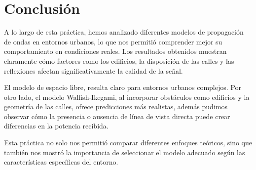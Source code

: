 \section{\Large Conclusión}

A lo largo de esta práctica, hemos analizado diferentes modelos de propagación de ondas en entornos urbanos, lo que nos permitió comprender mejor su comportamiento en condiciones reales. Los resultados obtenidos muestran claramente cómo factores como los edificios, la disposición de las calles y las reflexiones afectan significativamente la calidad de la señal.

El modelo de espacio libre, resulta claro para entornos urbanos complejos. Por otro lado, el modelo Walfish-Ikegami, al incorporar obstáculos como edificios y la geometría de las calles, ofrece predicciones más realistas, además pudimos observar cómo la presencia o ausencia de línea de vista directa puede crear diferencias en la potencia recibida.

Esta práctica no solo nos permitió comparar diferentes enfoques teóricos, sino que también nos mostró la importancia de seleccionar el modelo adecuado según las características específicas del entorno.